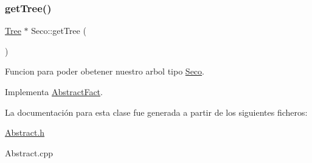 \mbox{\label{classSeco_ae4a078cccba29b3d89dcb62b6eeaa269}} 
\subsubsection{\texorpdfstring{get\+Tree()}{getTree()}}
{\footnotesize\ttfamily \hyperlink{classTree}{Tree} $\ast$ Seco\+::get\+Tree (\begin{DoxyParamCaption}{ }\end{DoxyParamCaption})\hspace{0.3cm}{\ttfamily [virtual]}}

Funcion para poder obetener nuestro arbol tipo \hyperlink{classSeco}{Seco}. 

Implementa \hyperlink{classAbstractFact_a37e763c0a454db79c61f229d33b72c73}{Abstract\+Fact}.



La documentación para esta clase fue generada a partir de los siguientes ficheros\+:\begin{DoxyCompactItemize}
\item 
\hyperlink{Abstract_8h}{Abstract.\+h}\item 
Abstract.\+cpp\end{DoxyCompactItemize}

